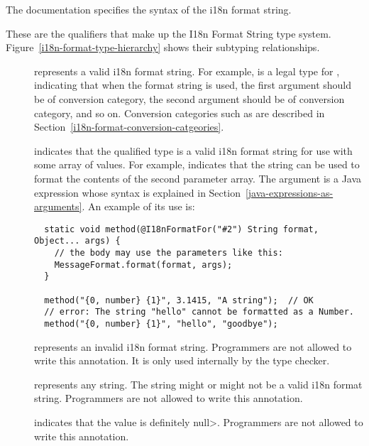 The  documentation
specifies the syntax of the i18n format string.

These are the qualifiers that make up the I18n Format String type system.
Figure~\ref{i18n-format-type-hierarchy} shows their subtyping relationships.

\begin{description}

\item[]
  represents a valid i18n format string. For example,
   is a legal type for
  , indicating that when the format
  string is used,
  the first argument should be of  conversion category,
  the second argument should be of  conversion category, and so on.
  Conversion categories such as  are described in
  Section~\ref{i18n-format-conversion-catgeories}.

\item[]
  indicates that the qualified type is a valid i18n format string for use
  with some array of values.  For example,
   indicates that the string can be used to
  format the contents of the second parameter array.
  The argument is a Java expression whose syntax
  is explained in Section~\ref{java-expressions-as-arguments}.
  An example of its use is:

\begin{Verbatim}
  static void method(@I18nFormatFor("#2") String format, Object... args) {
    // the body may use the parameters like this:
    MessageFormat.format(format, args);
  }

  method("{0, number} {1}", 3.1415, "A string");  // OK
  // error: The string "hello" cannot be formatted as a Number.
  method("{0, number} {1}", "hello", "goodbye");
\end{Verbatim}

\item[]
  represents an invalid i18n format string. Programmers are not allowed to
  write this annotation. It is only used internally by the type checker.

\item[]
  represents any string.  The string might or might not be a valid i18n
  format string.  Programmers are not allowed to write this annotation.

\item[]
  indicates that the value is definitely \<null>. Programmers are not allowed
  to write this annotation.
\end{description}

